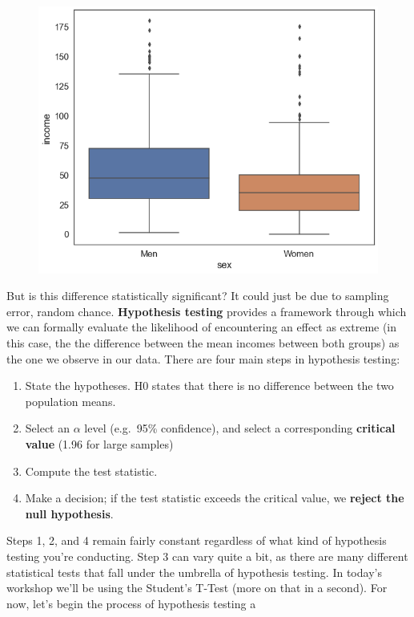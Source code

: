 \documentclass[
  letterpaper,
  DIV=11,
  numbers=noendperiod]{scrreprt}
\providecommand{\tightlist}{%
  \setlength{\itemsep}{0pt}\setlength{\parskip}{0pt}}\usepackage{longtable,booktabs,array}
\begin{document}
\begin{figure}[H]

{\centering \includegraphics{notebooks/W07. Hypothesis Testing_files/figure-pdf/cell-9-output-2.png}

}

\end{figure}

But is this difference statistically significant? It could just be due
to sampling error, random chance. \textbf{Hypothesis testing} provides a
framework through which we can formally evaluate the likelihood of
encountering an effect as extreme (in this case, the the difference
between the mean incomes between both groups) as the one we observe in
our data. There are four main steps in hypothesis testing:

\begin{enumerate}
\def\labelenumi{\arabic{enumi}.}
\tightlist
\item
  State the hypotheses. H0 states that there is no difference between
  the two population means.
\item
  Select an \(\alpha\) level (e.g.~95\% confidence), and select a
  corresponding \textbf{critical value} (1.96 for large samples)
\item
  Compute the test statistic.
\item
  Make a decision; if the test statistic exceeds the critical value, we
  \textbf{reject the null hypothesis}.
\end{enumerate}

Steps 1, 2, and 4 remain fairly constant regardless of what kind of
hypothesis testing you're conducting. Step 3 can vary quite a bit, as
there are many different statistical tests that fall under the umbrella
of hypothesis testing. In today's workshop we'll be using the Student's
T-Test (more on that in a second). For now, let's begin the process of
hypothesis testing a
\end{document}
